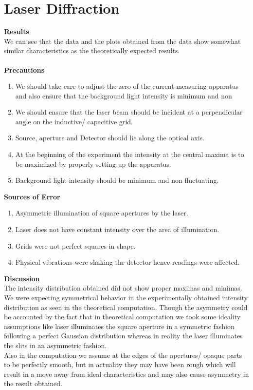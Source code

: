 \documentclass[12pt]{report}
\begin{document}
\section{Laser Diffraction}
\textbf{Results}\\
We can see that the data and the plots obtained from the data show somewhat similar characteristics as the theoretically expected results.\\\\
\textbf{Precautions}
\begin{enumerate}
	\item We should take care to adjust the zero of the current measuring apparatus and also ensure that the background light intensity is minimum and non
	\item We should ensure that the laser beam should be incident at a perpendicular angle on the inductive/ capacitive grid.
	\item Source, aperture and Detector should lie along the optical axis.
	\item At the beginning of the experiment the intensity at the central maxima is to be maximized by properly setting up the apparatus. 
	\item Background light intensity should be minimum and non fluctuating.
\end{enumerate}
\textbf{Sources of Error}
\begin{enumerate}
	\item Asymmetric illumination of square apertures by the laser.
	\item Laser does not have constant intensity over the area of illumination.
	\item Grids were not perfect squares in shape.
	\item Physical vibrations were shaking the detector hence readings were affected. 
\end{enumerate}
\textbf{Discussion}\\
The intensity distribution obtained did not show proper maximas and minimas. We were expecting symmetrical behavior in the experimentally obtained intensity distribution as seen in the theoretical computation. Though the asymmetry could be accounted by the fact that in theoretical computation we took some ideality assumptions like laser illuminates the square aperture in a symmetric fashion following a perfect Gaussian distribution whereas in reality the laser illuminates the slits in an asymmetric fashion.\\
Also in the computation we assume at the edges of the apertures/ opaque parts to be perfectly smooth, but in actuality they may have been rough which will result in a move away from ideal characteristics and may also cause asymmetry in the result obtained.\\\\
\end{document}
